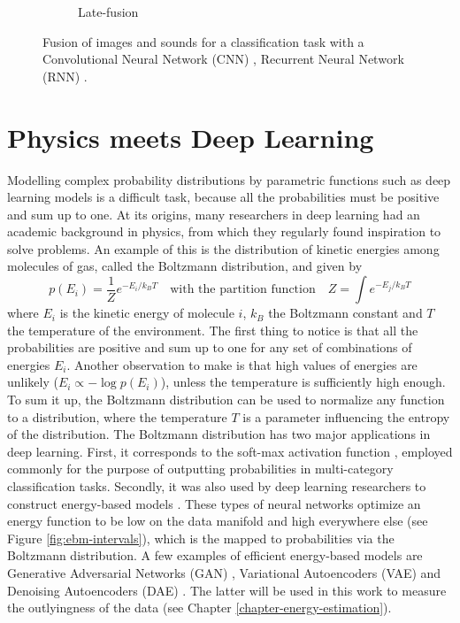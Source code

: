 \begin{figure}[!h]
\begin{subfigure}{.45\textwidth}
  \vspace*{2mm}
  \caption{Late-fusion}
  \label{fig:late-fusion}
\end{subfigure}
\caption[Early and late fusion]{Fusion of images and sounds for a classification task with a Convolutional Neural Network (CNN) \citep{image-recognition}, Recurrent Neural Network (RNN) \citep{machine-translation}.}
\label{fig:fusion}
\end{figure}


\section{Physics meets Deep Learning}\label{sec:ebm}
Modelling complex probability distributions by parametric functions such as deep learning models is a difficult task, because all the probabilities must be positive and sum up to one. At its origins, many researchers in deep learning had an academic background in physics, from which they regularly found inspiration to solve problems. An example of this is the distribution of kinetic energies among molecules of gas, called the Boltzmann distribution, and given by
\begin{equation}
p(E_i) = \frac{1}{Z}e^{-E_i/k_B T} \quad \text{with the partition function} \quad Z = \int e^{-E_j/k_B T}
\label{eq:boltzmann-distrib}
\end{equation}
where $E_i$ is the kinetic energy of molecule $i$, $k_B$ the Boltzmann constant and $T$ the temperature of the environment. The first thing to notice is that all the probabilities are positive and sum up to one for any set of combinations of energies $E_i$. Another observation to make is that high values of energies are unlikely ($E_i \propto -\log p(E_i)$), unless the temperature is sufficiently high enough. To sum it up, the Boltzmann distribution can be used to normalize any function to a distribution, where the temperature $T$ is a parameter influencing the entropy of the distribution. The Boltzmann distribution has two major applications in deep learning. First, it corresponds to the soft-max activation function \citep{softmax}, employed commonly for the purpose of outputting probabilities in multi-category classification tasks. Secondly, it was also used by deep learning researchers to construct energy-based models \citep{ebm-tutorial}. These types of neural networks optimize an energy function to be low on the data manifold and high everywhere else (see Figure \ref{fig:ebm-intervals}), which is the mapped to probabilities via the Boltzmann distribution. A few examples of efficient energy-based models are Generative Adversarial Networks (GAN) \citep{gan}, Variational Autoencoders (VAE) \citep{kingma-vae} and Denoising Autoencoders (DAE) \citep{dae-vincent}. The latter will be used in this work to measure the outlyingness of the data (see Chapter \ref{chapter-energy-estimation}).
